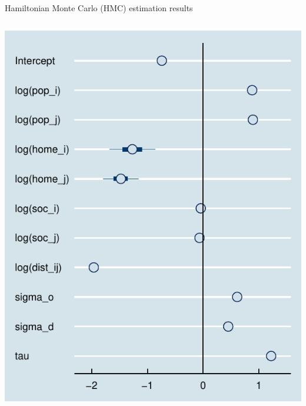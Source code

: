 \documentclass{beamer}
\begin{document}
\begin{frame}{Hamiltonian Monte Carlo (HMC) estimation results}
\begin{columns}
\begin{column}{0.5\textwidth}
			\begin{center}
				\includegraphics[width=\textwidth]{../fig/forestplot}      
			\end{center}
		\end{column}
	\end{columns}
\end{frame}
\end{document}

